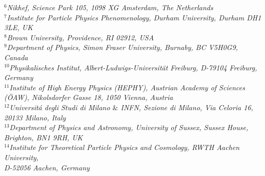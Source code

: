 \documentclass[11pt]{article}
\begin{document}
\begin{titlepage}
\begin{center}
    \textit{$^{6}$Nikhef, Science Park 105, 1098 XG Amsterdam, The Netherlands }\\
    \textit{$^{7}$Institute for Particle Physics Phenomenology, Durham University, Durham DH1 3LE, UK}\\
    \textit{$^{8}$Brown University, Providence, RI 02912, USA} \\
    \textit{$^{9}$Department of Physics, Simon Fraser University, Burnaby, BC V5H0G9, Canada}\\
    \textit{$^{10}$Physikalisches Institut, Albert-Ludwigs-Universit\"at Freiburg, D-79104 Freiburg, Germany} \\
    \textit{$^{11}$Institute of High Energy Physics (HEPHY), Austrian Academy of Sciences (\"{O}AW), Nikolsdorfer Gasse 18, 1050 Vienna, Austria}\\
    \textit{$^{12}$Universit\'{a} degli Studi di Milano $\&$ INFN, Sezione di Milano, Via Celoria 16, 20133 Milano, Italy}\\
    \textit{$^{13}$Department of Physics and Astronomy, University of Sussex, Sussex House, Brighton, BN1 9RH, UK}\\
    \textit{$^{14}$Institute for Theoretical Particle Physics and Cosmology, RWTH Aachen University, \\D-52056 Aachen, Germany}\\



\textbf{}
	\end{center}

        \thispagestyle{empty}



\end{titlepage}
\end{document}
